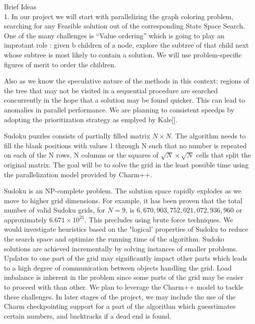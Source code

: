 \documentclass[10pt,twoside]{article}
\newcommand{\sps}{State Space Search}
\begin{document}
Brief Ideas \\ 
  1. In our project we will start with   parallelizing the graph coloring problem,  searching for any 
  Feasible solution out of the corresponding \sps.  
  One of the many challenges is ``Value ordering'' which is going to play an improtant role : given b children of a node, explore the subtree of that child next whose subtree is
most likely to contain a solution. We will use problem-specific figures of merit   to order the children. 

Also as we know the speculative nature of the methods in this context: regions of the tree that may not be visited in a sequential procedure are
searched concurrently in the hope that a solution may be found quicker. This can lead to anomalies
in parallel performance. We are planning to consistent speedps by adopting the prioritization strategy as emplyed by Kale[].



  Sudoku puzzles consists of partially filled matrix $N \times N$. The algorithm needs
  to fill the blank positions with values 1 through N such that no number is
  repeated on each of the N rows, N columns or the squares of $\sqrt{N} \times
  \sqrt{N} $ cells that split the original matrix.  The goal will be to solve
  the grid in the least possible time using the parallelization model provided by Charm++.

  Sudoku is an NP-complete problem. The solution space rapidly explodes as we move to 
  higher grid dimensions. For example, it has been proven that the total number of
  valid Sudoku grids, for $N = 9$,  is $6,670,903,752,021,072,936,960$ or
  approximately $6.671 \times 10^{21}$. This precludes using brute force techniques. We would 
  investigate heuristics based on the "logical' properties of Sudoku to reduce the search space 
  and optimize the running time of the algorithm. Sudoko solutions are achieved incrementally by 
  solving instances of smaller problems. Updates to one part of the grid may significantly
  impact other parts which leads to a high degree of communication between objects handling the 
  grid. Load imbalance is inherent in the problem since some parts of the grid may be easier to
  proceed with than other. We plan to leverage the Charm++ model to tackle these challenges. In later 
  stages of the project, we may include the use of the Charm checkpointing support for a part of the
  algorithm which guesstimates certain numbers, and backtracks if a dead end is found.
\end{document}
